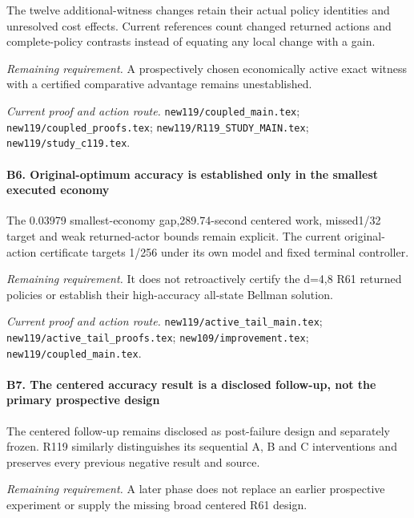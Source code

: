 The twelve additional-witness changes retain their actual policy identities and unresolved cost effects. Current references count changed returned actions and complete-policy contrasts instead of equating any local change with a gain.

\par\emph{Remaining requirement.} A prospectively chosen economically active exact witness with a certified comparative advantage remains unestablished.

\par\emph{Current proof and action route.} \nolinkurl{new119/coupled_main.tex}; \nolinkurl{new119/coupled_proofs.tex}; \nolinkurl{new119/R119_STUDY_MAIN.tex}; \nolinkurl{new119/study_c119.tex}.

\paragraph{B6. Original-optimum accuracy is established only in the smallest executed economy}

The 0.03979 smallest-economy gap,289.74-second centered work, missed1/32 target and weak returned-actor bounds remain explicit. The current original-action certificate targets 1/256 under its own model and fixed terminal controller.

\par\emph{Remaining requirement.} It does not retroactively certify the d=4,8 R61 returned policies or establish their high-accuracy all-state Bellman solution.

\par\emph{Current proof and action route.} \nolinkurl{new119/active_tail_main.tex}; \nolinkurl{new119/active_tail_proofs.tex}; \nolinkurl{new109/improvement.tex}; \nolinkurl{new119/coupled_main.tex}.

\paragraph{B7. The centered accuracy result is a disclosed follow-up, not the primary prospective design}

The centered follow-up remains disclosed as post-failure design and separately frozen. R119 similarly distinguishes its sequential A, B and C interventions and preserves every previous negative result and source.

\par\emph{Remaining requirement.} A later phase does not replace an earlier prospective experiment or supply the missing broad centered R61 design.

